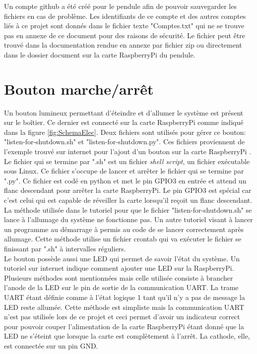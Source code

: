 Un compte github a été créé pour le pendule afin de pouvoir sauvegarder les fichiers en cas de problème. Les identifiants de ce compte et
des autres comptes liés à ce projet sont donnés dans le fichier texte "Comptes.txt" qui ne se trouve pas en annexe de ce document pour des
raisons de sécurité. Le fichier peut être trouvé dans la documentation rendue en annexe par fichier zip ou directement dans le dossier document
sur la carte RaspberryPi du pendule.

\section{Bouton marche/arrêt}
Un bouton lumineux permettant d'éteindre et d'allumer le système est présent sur le boîtier. Ce dernier est connecté sur la carte RaspberryPi comme
indiqué dans la figure \ref{fig:SchemaElec}. Deux fichiers sont utilisés pour gérer ce bouton: "listen-for-shutdown.sh" et "listen-for-shutdown.py".
Ces fichiers proviennent de l'exemple trouvé sur internet pour l'ajout d'un bouton sur la carte RaspberryPi \cite{ButtonAdd}. Le fichier qui se
termine par ".sh" est un fichier \textit{shell script}, un fichier exécutable sous Linux. Ce fichier s'occupe de lancer et arrêter le
fichier qui se termine par ".py". Ce fichier est codé en python et met le pin GPIO3 en entrée et attend un flanc descendant pour arrêter la
carte RaspberryPi. Le pin GPIO3 est spécial car c'est celui qui est capable de réveiller la carte lorsqu'il reçoit un flanc descendant.\\

La méthode utilisée dans le tutoriel pour que le fichier "listen-for-shutdown.sh" se lance à l'allumage du système ne fonctionne pas. Un autre
tutoriel visant à lancer un programme au démarrage \cite{ScriptStartup} à permis au code de se lancer correctement après allumage. Cette méthode
utilise un fichier crontab qui va exécuter le fichier se finissant par ".sh" à intervalles réguliers.\\

Le bouton possède aussi une LED qui permet de savoir l'état du système. Un tutoriel sur internet \cite{LEDAdd} indique comment ajouter une LED
sur la RaspberryPi. Plusieurs méthodes sont mentionnées mais celle utilisée consiste à brancher l'anode de la LED sur le pin de sortie de la
communication UART. La trame UART étant définie comme à l'état logique 1 tant qu'il n'y a pas de message la LED reste allumée. Cette méthode
est simpliste mais la communication UART n'est pas utilisée lors de ce projet et ceci permet d'avoir un indicateur correct pour pouvoir couper
l'alimentation de la carte RaspberryPi étant donné que la LED ne s'éteint que lorsque la carte est complètement à l'arrêt. La cathode, elle,
est connectée sur un pin GND.

